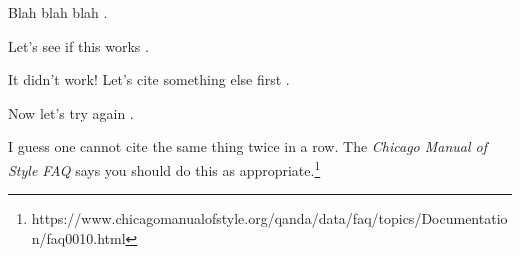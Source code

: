 \documentclass{article}
\begin{document}
Blah blah blah \parencite{CharnessDufwenberg2006}.

Let's see if this works \parencite[\textit{c.f.},][]{CharnessDufwenberg2006}.

It didn't work! Let's cite something else first \parencite{BeattieLoomes1997}.

Now let's try again \parencite[\textit{c.f.},][]{CharnessDufwenberg2006}.

I guess one cannot cite the same thing twice in a row. The \emph{Chicago Manual of Style FAQ} says you should do this as appropriate.\footnote{https://www.chicagomanualofstyle.org/qanda/data/faq/topics/Documentation/faq0010.html}
\end{document}
